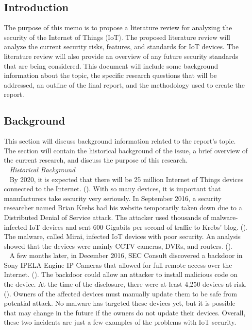 \documentclass[letterpaper, 12pt]{texMemo}
\begin{document}
\maketitle
\begin{flushleft}
\subsection*{Introduction}
The purpose of this memo is to propose a literature review for analyzing the security of the Internet of Things (IoT). 
The proposed literature review will analyze the current security risks, features, and standards for IoT devices. The literature review will also provide
an overview of any future security standards that are being considered.
This document will include some background information about the topic, the specific research questions that will be addressed, an outline of
the final report, and the methodology used to create the report.

\subsection*{Background}
This section will discuss background information related to the report's topic. The section will contain the historical background of the issue, a brief
overview of the current research, and discuss the purpose of this research. \\
~\newline
\textit{Historical Background}\\ 
~\newline
By 2020, it is expected that there will be 
25 million Internet of Things devices connected to the Internet. (\cite{Martinez1}). With so many devices, it is important that manufacturers take security very seriously. 
In September 2016, a security researcher named Brian Krebs had his website temporarily taken down due to a Distributed Denial of Service attack. The attacker
used thousands of malware-infected IoT devices and sent 600 Gigabits per second of traffic to Krebs' blog. (\cite{Krebs}). The malware, called Mirai, 
infected IoT devices with poor security. An analysis showed that the devices were mainly CCTV cameras, DVRs, and routers. (\cite{Incapsula}).\\
~\newline
A few months later, in December 2016, SEC Consult discovered a backdoor in Sony IPELA Engine IP Cameras that allowed for full remote access over the Internet. (\cite{sec}). The backdoor could allow an attacker
to install malicious code on the device. At the time of the disclosure, there were at least 4,250 devices at risk. (\cite{Krebs2}). Owners of the affected devices must manually update them
to be safe from potential attack. No malware has targeted these devices yet, but it is possible that may change in the future if the owners do not update their devices. Overall, these two incidents
are just a few examples of the problems with IoT security.\\


\end{flushleft}
\end{document}
